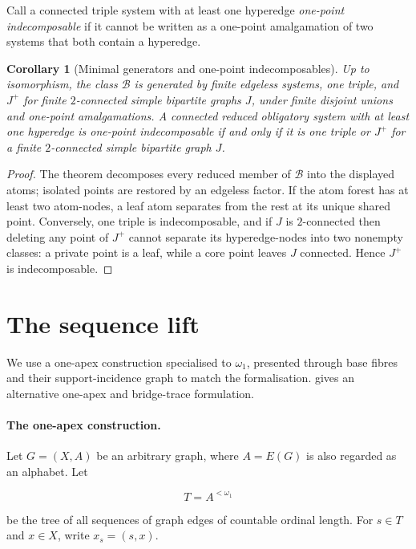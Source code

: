 \documentclass[a4paper,11pt,reqno]{amsart}
\theoremstyle{plain}
\newtheorem{corollary}[theorem]{Corollary}
\theoremstyle{definition}
\theoremstyle{remark}
\begin{document}
Call a connected triple system with at least one hyperedge \emph{one-point
indecomposable} if it cannot be written as a one-point amalgamation of two
systems that both contain a hyperedge.

\begin{corollary}[Minimal generators and one-point indecomposables]
\label{corollary-minimal-generators-indecomposables}
Up to isomorphism, the class $\mathcal B$ is generated by finite edgeless
systems, one triple, and $J^+$ for finite $2$-connected simple bipartite graphs
$J$, under finite disjoint unions and one-point amalgamations.  A connected
reduced obligatory system with at least one hyperedge is
one-point indecomposable if and only if it is one triple or $J^+$ for a finite
$2$-connected simple bipartite graph $J$.
\end{corollary}
\begin{proof}
The theorem decomposes every reduced member of $\mathcal B$ into the displayed
atoms; isolated points are restored by an edgeless factor.  If the atom forest
has at least two atom-nodes, a leaf atom separates from the rest at its unique
shared point.  Conversely, one triple is indecomposable, and if $J$ is
$2$-connected then deleting any point of $J^+$ cannot separate its
hyperedge-nodes into two nonempty classes: a private point is a leaf, while a
core point leaves $J$ connected.  Hence $J^+$ is indecomposable.
\end{proof}

\section{The sequence lift}\label{the-sequence-lift-used-in-the-avoidance-constructions}

We use a one-apex construction specialised to $\omega_1$, presented through
base fibres and their support-incidence graph to match the formalisation.
\citet[Sections~3--4 and Theorem~4.6]{li2026} gives an alternative one-apex
and bridge-trace formulation.

\paragraph{The one-apex construction.}\label{the-one-apex-construction}

Let \(G=(X,A)\) be an arbitrary graph, where \(A=E(G)\) is also regarded as an alphabet. Let

\[
T=A^{<\omega_1}
\]

be the tree of all sequences of graph edges of countable ordinal length. For \(s\in T\) and \(x\in X\), write \(x_s=(s,x)\).
\end{document}
